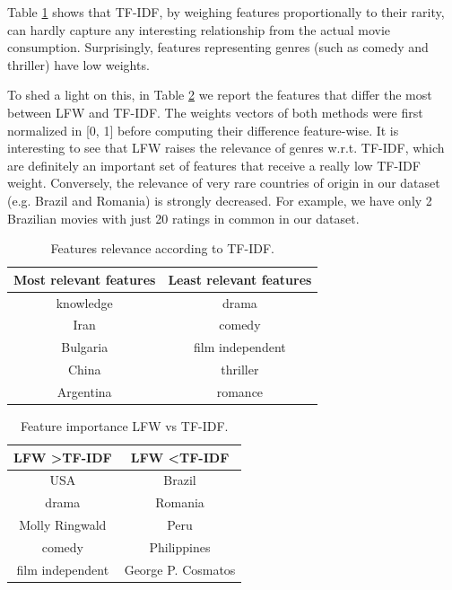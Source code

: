 \documentclass{sig-alternate}
\begin{document}
Table \ref{tab5} shows that TF-IDF, by weighing features proportionally
to their rarity, can hardly capture any interesting relationship from
the actual movie consumption. Surprisingly, features representing
genres (such as comedy and thriller) have low weights.

To shed a light on this, in Table \ref{tab6} we report the features that
differ the most between LFW and TF-IDF. The weights vectors of
both methods were first normalized in [0, 1] before computing their
difference feature-wise. It is interesting to see that LFW raises the
relevance of genres w.r.t. TF-IDF, which are definitely an important
set of features that receive a really low TF-IDF weight. Conversely,
the relevance of very rare countries of origin in our dataset (e.g.
Brazil and Romania) is strongly decreased. For example, we have
only 2 Brazilian movies with just 20 ratings in common in our
dataset.

\begin{table}[ht]
    \centering
    \caption{Features relevance according to TF-IDF.}
    \label{tab5}
    \begin{tabular}{cc}
        \hline
        Most relevant features & Least relevant features \\ \hline
        knowledge              & drama                   \\
        Iran                   & comedy                  \\
        Bulgaria               & film independent        \\
        China                  & thriller                \\
        Argentina              & romance                 \\ \hline
    \end{tabular}
\end{table}

\begin{table}[ht]
    \centering
    \caption{Feature importance LFW vs TF-IDF.}
    \label{tab6}
    \begin{tabular}{cc}
        \hline
        LFW \textgreater{}TF-IDF & LFW \textless TF-IDF \\ \hline
        USA                      & Brazil               \\
        drama                    & Romania              \\
        Molly Ringwald           & Peru                 \\
        comedy                   & Philippines          \\
        film independent         & George P. Cosmatos   \\ \hline
    \end{tabular}
\end{table}
\end{document}
